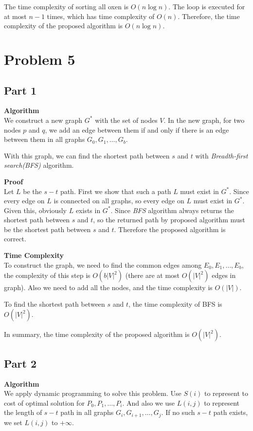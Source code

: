 \documentclass{article}
\newcommand{\Complexity}{\vspace{0.3cm} \noindent\textbf{Time Complexity} \\}
\newcommand{\Proof}{\vspace{0.3cm} \noindent\textbf{Proof} \\}
\newcommand{\Algorithm}{\textbf{Algorithm} \\}
\begin{document}
The time complexity of sorting all oxen is $O(n\log n)$. The loop is executed for at most $n-1$
times, which has time complexity of $O(n)$. Therefore, the time complexity of the proposed algorithm
is $O(n\log n)$.

\section*{Problem 5}
\subsection*{Part 1}
\Algorithm
We construct a new graph $G^*$ with the set of nodes $V$. In the new graph, for two nodes $p$ and $q$,
we add an edge between them if and only if there is an edge between them in all graphs $G_0, G_1,
\dots, G_b$.

With this graph, we can find the shortest path between $s$ and $t$ with \textit{Breadth-first
search(BFS)} 
algorithm.

\Proof
Let $L$ be the  $s-t$ path. First we show that such a path $L$ must exist in $G^*$. Since
every edge on $L$ is connected on all graphs, so every edge on $L$ must exist in $G^*$. Given this,
obviously $L$ exists in $G^*$. Since \textit{BFS} algorithm always returns the shortest
path between $s$ and $t$, so the returned path by proposed algorithm must be the shortest path
between $s$ and $t$. Therefore the proposed algorithm is correct.

\Complexity
To construct the graph, we need to find the common edges among $E_0,E_1,\dots,E_b$, the complexity
of this step is $O(b|V|^2)$ (there are at most $O(|V|^2)$ edges in graph). 
Also we need to add all the nodes, and the time complexity  is $O(|V|)$.

To find the shortest path between $s$ and $t$, the time complexity of BFS is $O(|V|^2)$.

In summary, the time complexity of the proposed algorithm is $O(|V|^2)$.

\subsection*{Part 2}
\Algorithm
We apply dynamic programming to solve this problem. Use $S(i)$ to represent to cost of optimal solution
for $P_0, P_1, \dots, P_i$. And also we use $L(i, j)$ to represent the length of $s-t$ path
in all graphs $G_i, G_{i+1}, \dots, G_j$. If no such $s-t$ path exists, we set $L(i, j)$ to
$+\infty$.
\end{document}
